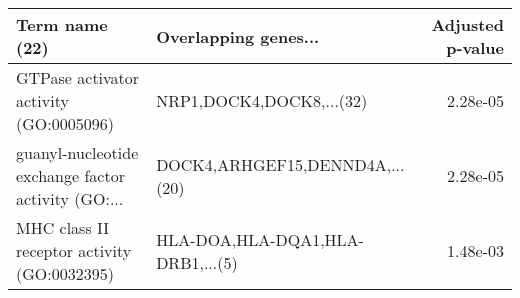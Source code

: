 \begin{tabular}{llr}
\toprule
                                    Term name (22) &             Overlapping genes... &  Adjusted p-value \\
\midrule
            GTPase activator activity (GO:0005096) &         NRP1,DOCK4,DOCK8,...(32) &          2.28e-05 \\
guanyl-nucleotide exchange factor activity (GO:... &   DOCK4,ARHGEF15,DENND4A,...(20) &          2.28e-05 \\
       MHC class II receptor activity (GO:0032395) & HLA-DOA,HLA-DQA1,HLA-DRB1,...(5) &          1.48e-03 \\
\bottomrule
\end{tabular}
